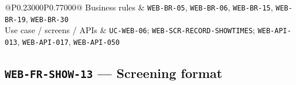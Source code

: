 \begin{longtable}{@{}P{0.23000\SRSWidth}P{0.77000\SRSWidth}@{}}
Business rules & \texttt{WEB-\allowbreak{}BR-\allowbreak{}05}, \texttt{WEB-\allowbreak{}BR-\allowbreak{}06}, \texttt{WEB-\allowbreak{}BR-\allowbreak{}15}, \texttt{WEB-\allowbreak{}BR-\allowbreak{}19}, \texttt{WEB-\allowbreak{}BR-\allowbreak{}30} \\[3pt]
Use case /\allowbreak{} screens /\allowbreak{} APIs & \texttt{UC-\allowbreak{}WEB-\allowbreak{}06}; \texttt{WEB-\allowbreak{}SCR-\allowbreak{}RECORD-\allowbreak{}SHOWTIME\allowbreak{}S}; \texttt{WEB-\allowbreak{}API-\allowbreak{}013}, \texttt{WEB-\allowbreak{}API-\allowbreak{}017}, \texttt{WEB-\allowbreak{}API-\allowbreak{}050} \\[3pt]
\end{longtable}
\endgroup

\subsection{\texttt{WEB-\allowbreak{}FR-\allowbreak{}SHOW-\allowbreak{}13} — Screening format}
\begingroup
\fontsize{9.5}{12}\selectfont
\setlength{\SRSWidth}{\dimexpr\linewidth-2\tabcolsep\relax}
